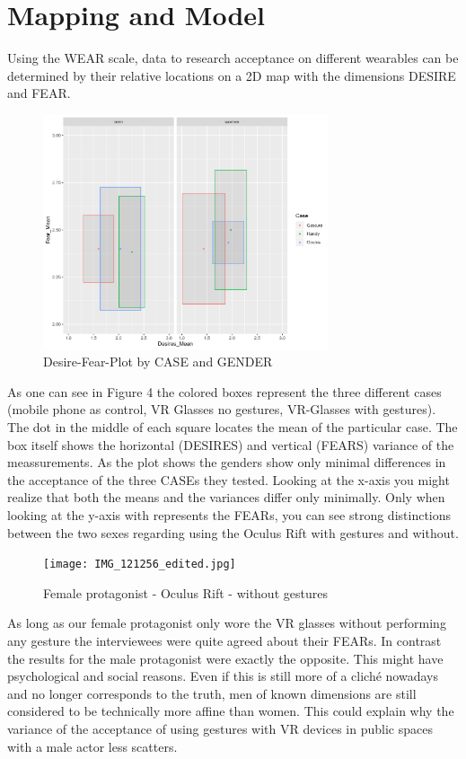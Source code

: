 \documentclass[sigchi]{acmart}
\begin{document}
\section {Mapping and Model}
Using the WEAR scale, data to research acceptance on different wearables can be determined by their relative locations on a 2D map with the dimensions DESIRE and FEAR.

\begin{figure}[h]
\includegraphics[width=84mm]{WEAR-figure.png} 
\caption{Desire-Fear-Plot by CASE and GENDER}
\end{figure}

As one can see in Figure 4 the colored boxes represent the three different cases  (mobile phone as control, VR Glasses no gestures, VR-Glasses with gestures). The dot in the middle of each square locates the mean of the particular case. The box itself shows the horizontal (DESIRES) and vertical (FEARS) variance of the meassurements. As the plot shows the genders show only minimal differences in the acceptance of the three CASEs they tested. Looking at the x-axis you might realize that both the means and the variances differ only minimally. Only when looking at the y-axis with represents the FEARs, you can see strong distinctions between the two sexes regarding using the Oculus Rift with gestures and without.

\begin{figure}[h]
\texttt{[image: IMG\_121256\_edited.jpg]} 
\caption{Female protagonist - Oculus Rift - without gestures}
\end{figure}

 As long as our female protagonist only wore the VR glasses without performing any gesture the interviewees were quite agreed about their FEARs. In contrast the results for the male protagonist were exactly the opposite. This might have psychological and social reasons. Even if this is still more of a cliché nowadays and no longer corresponds to the truth, men of known dimensions are still considered to be technically more affine than women. This could explain why the variance of the acceptance of using gestures with VR devices in public spaces with a male actor less scatters. 
\end{document}
